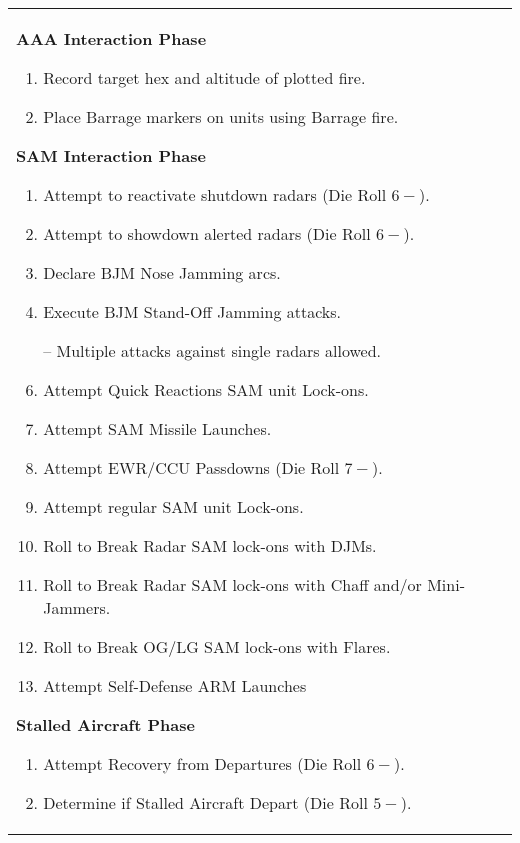 \begin{twocolumntable}

\medskip

\newcommand{\sopphase}[1]{\smallskip\textbf{#1}\par\smallskip}

\begin{tabularx}{1.0\linewidth}{X}
\toprule
\begin{multicols}{2}
\footnotesize
\sopphase{AAA Interaction Phase}

\begin{enumerate}[nosep]
    \item Record target hex and altitude of plotted fire.
    \item Place Barrage markers on units using Barrage fire.
\end{enumerate}

\sopphase{SAM Interaction Phase}

\begin{enumerate}[nosep]
    \item Attempt to reactivate shutdown radars (Die Roll $6-$).
    \item Attempt to showdown alerted radars (Die Roll $6-$).
    \item Declare BJM Nose Jamming arcs.
    \item Execute BJM Stand-Off Jamming attacks.
    \item[--] Multiple attacks against single radars allowed.
    \item Attempt Quick Reactions SAM unit Lock-ons.
    \item Attempt SAM Missile Launches.
    \item Attempt EWR/CCU Passdowns (Die Roll $7-$).
    \item Attempt regular SAM unit Lock-ons.
    \item Roll to Break Radar SAM lock-ons with DJMs.
    \item Roll to Break Radar SAM lock-ons with Chaff and/or Mini-Jammers.
    \item Roll to Break OG/LG SAM lock-ons with Flares.
    \item Attempt Self-Defense ARM Launches
\end{enumerate}

\sopphase{Stalled Aircraft Phase}

\begin{enumerate}[nosep]
    \item Attempt Recovery from Departures (Die Roll $6-$).
    \item Determine if Stalled Aircraft Depart (Die Roll $5-$).
\end{enumerate}


\end{multicols}
\end{tabularx}
\end{twocolumntable}
